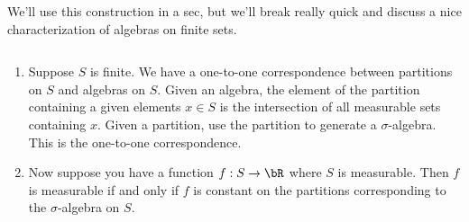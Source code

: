 We'll use this construction in a sec, but we'll break really quick and discuss a nice characterization of algebras on finite sets.

\begin{example}\label{example:algebras-are-partitions-finite}
  $ $
  \begin{enumerate}
    \item Suppose $S$ is finite. We have a one-to-one correspondence between partitions on $S$ and algebras on $S$. Given an algebra, the element of the partition containing a given elements $x \in S$ is the intersection of all measurable sets containing $x$. Given a partition, use the partition to generate a $\sigma$-algebra. This is the one-to-one correspondence.
    \item Now suppose you have a function $f:S\to \bR$ where $S$ is measurable. Then $f$ is measurable if and only if $f$ is constant on the partitions corresponding to the $\sigma$-algebra on $S$.
  \end{enumerate}
\end{example}
\printbibliography


